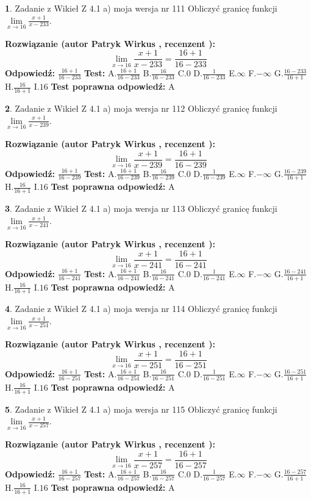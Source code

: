 \documentclass[12pt, a4paper]{article}
\theoremstyle{definition} %
\newtheorem{zad}{}
\newcommand{\zadStart}[1]{\begin{zad}#1\newline}
\newcommand{\zadStop}{\end{zad}}
\newcommand{\rozwStart}[2]{\noindent \textbf{Rozwiązanie (autor #1 , recenzent #2): }\newline}
\newcommand{\rozwStop}{\newline}
\newcommand{\odpStart}{\noindent \textbf{Odpowiedź:}\newline}
\newcommand{\odpStop}{\newline}
\newcommand{\testStart}{\noindent \textbf{Test:}\newline}
\newcommand{\testStop}{\newline}
\newcommand{\kluczStart}{\noindent \textbf{Test poprawna odpowiedź:}\newline}
\newcommand{\kluczStop}{\newline}
\begin{document}
\zadStart{Zadanie z Wikieł Z 4.1 a) moja wersja nr 111}
Obliczyć granicę funkcji $\lim\limits_{x\to16}\frac{x+1}{x-233}$.
\zadStop
\rozwStart{Patryk Wirkus}{}
$$\lim\limits_{x\to16}\frac{x+1}{x-233} = \frac{16+1}{16-233}$$
\rozwStop
\odpStart
$\frac{16+1}{16-233}$
\odpStop
\testStart
A.$\frac{16+1}{16-233}$
B.$\frac{16}{16-233}$
C.$0$
D.$\frac{1}{16-233}$
E.$\infty$
F.$-\infty$
G.$\frac{16-233}{16+1}$
H.$\frac{16}{16+1}$
I.$16$
\testStop
\kluczStart
A
\kluczStop



\zadStart{Zadanie z Wikieł Z 4.1 a) moja wersja nr 112}
Obliczyć granicę funkcji $\lim\limits_{x\to16}\frac{x+1}{x-239}$.
\zadStop
\rozwStart{Patryk Wirkus}{}
$$\lim\limits_{x\to16}\frac{x+1}{x-239} = \frac{16+1}{16-239}$$
\rozwStop
\odpStart
$\frac{16+1}{16-239}$
\odpStop
\testStart
A.$\frac{16+1}{16-239}$
B.$\frac{16}{16-239}$
C.$0$
D.$\frac{1}{16-239}$
E.$\infty$
F.$-\infty$
G.$\frac{16-239}{16+1}$
H.$\frac{16}{16+1}$
I.$16$
\testStop
\kluczStart
A
\kluczStop



\zadStart{Zadanie z Wikieł Z 4.1 a) moja wersja nr 113}
Obliczyć granicę funkcji $\lim\limits_{x\to16}\frac{x+1}{x-241}$.
\zadStop
\rozwStart{Patryk Wirkus}{}
$$\lim\limits_{x\to16}\frac{x+1}{x-241} = \frac{16+1}{16-241}$$
\rozwStop
\odpStart
$\frac{16+1}{16-241}$
\odpStop
\testStart
A.$\frac{16+1}{16-241}$
B.$\frac{16}{16-241}$
C.$0$
D.$\frac{1}{16-241}$
E.$\infty$
F.$-\infty$
G.$\frac{16-241}{16+1}$
H.$\frac{16}{16+1}$
I.$16$
\testStop
\kluczStart
A
\kluczStop



\zadStart{Zadanie z Wikieł Z 4.1 a) moja wersja nr 114}
Obliczyć granicę funkcji $\lim\limits_{x\to16}\frac{x+1}{x-251}$.
\zadStop
\rozwStart{Patryk Wirkus}{}
$$\lim\limits_{x\to16}\frac{x+1}{x-251} = \frac{16+1}{16-251}$$
\rozwStop
\odpStart
$\frac{16+1}{16-251}$
\odpStop
\testStart
A.$\frac{16+1}{16-251}$
B.$\frac{16}{16-251}$
C.$0$
D.$\frac{1}{16-251}$
E.$\infty$
F.$-\infty$
G.$\frac{16-251}{16+1}$
H.$\frac{16}{16+1}$
I.$16$
\testStop
\kluczStart
A
\kluczStop



\zadStart{Zadanie z Wikieł Z 4.1 a) moja wersja nr 115}
Obliczyć granicę funkcji $\lim\limits_{x\to16}\frac{x+1}{x-257}$.
\zadStop
\rozwStart{Patryk Wirkus}{}
$$\lim\limits_{x\to16}\frac{x+1}{x-257} = \frac{16+1}{16-257}$$
\rozwStop
\odpStart
$\frac{16+1}{16-257}$
\odpStop
\testStart
A.$\frac{16+1}{16-257}$
B.$\frac{16}{16-257}$
C.$0$
D.$\frac{1}{16-257}$
E.$\infty$
F.$-\infty$
G.$\frac{16-257}{16+1}$
H.$\frac{16}{16+1}$
I.$16$
\testStop
\kluczStart
A
\kluczStop
\end{document}
